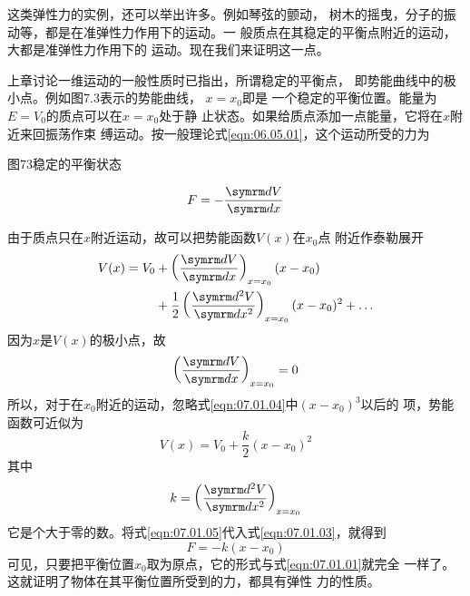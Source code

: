 这类弹性力的实例，还可以举出许多。例如琴弦的颤动，
树木的摇曳，分子的振动等，都是在准弹性力作用下的运动。一
般质点在其稳定的平衡点附近的运动，大都是准弹性力作用下的
运动。现在我们来证明这一点。

上章讨论一维运动的一般性质时已指出，所谓稳定的平衡点，
即势能曲线中的极小点。例如图7.3表示的势能曲线， $ x = x _ { 0 }   $即是
一个稳定的平衡位置。能量为$ E = V _ 0 $的质点可以在$  x = x _ { 0 }   $处于静
止状态。如果给质点添加一点能量，它将在$ x $附近来回振荡作束
缚运动。按一般理论式\eqref{eqn:06.05.01}，这个运动所受的力为

图73稳定的平衡状态

\begin{equation}\label{eqn:07.01.03}
	F = - \frac { \dif V } { \dif x }  
\end{equation}

由于质点只在$ x $附近运动，故可以把势能函数$ V(x) $在$  x _ { 0 }   $点
附近作泰勒展开
\begin{equation}\label{eqn:07.01.04}
	\begin{aligned}
	V ( x ) = V _ { 0 } &+ \left ( \frac { \dif V } { \dif x } \right ) _ { x = x _ { 0 } } ( x - x _ { 0 } )  \\
&+ \frac { 1 } { 2 } \left( \frac { \dif ^ { 2 } V } { \dif x ^ { 2 } } \right) _ { x = x _ { 0 } } ( x - x _ { 0 } ) ^ { 2 } + \dots
	\end{aligned}
\end{equation}
因为$ x $是$ V(x) $的极小点，故
\begin{equation*}
	\left ( \frac { \dif V } { \dif x } \right ) _ { x = x _ { 0 } }  = 0 
\end{equation*}
所以，对于在$ x _ { 0 } $附近的运动，忽略式\eqref{eqn:07.01.04}中$ ( x - x _ { 0 } ) ^ { 3 }  $以后的
项，势能函数可近似为
\begin{equation}\label{eqn:07.01.05}
	V ( x ) = V _ { 0 } + \frac { k } { 2 } ( x - x _ { 0 } ) ^ { 2 }  
\end{equation}
其中
\begin{equation}\label{eqn:07.01.06}
	k = \left( \frac { \dif ^ { 2 } V } { \dif x ^ { 2 } } \right) _ { x = x _ { 0 } }
\end{equation}
它是个大于零的数。将式\eqref{eqn:07.01.05}代入式\eqref{eqn:07.01.03}，就得到
\begin{equation}\label{eqn:07.01.07}
	F = - k ( x - x _ { 0 } )  
\end{equation}
可见，只要把平衡位置$ x _ 0 $取为原点，它的形式与式\eqref{eqn:07.01.01}就完全
一样了。这就证明了物体在其平衡位置所受到的力，都具有弹性
力的性质。

